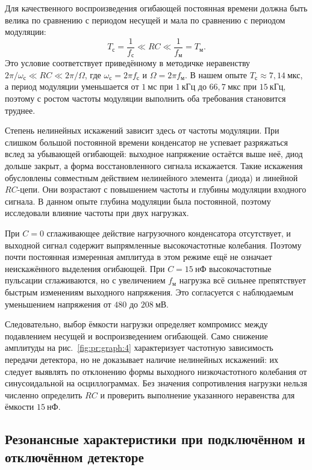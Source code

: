 Для качественного воспроизведения огибающей постоянная времени должна быть велика по сравнению с периодом несущей и мала по сравнению с периодом модуляции:
\[
T_{\text{с}}=\frac{1}{f_{\text{с}}}\ll RC\ll\frac{1}{f_{\text{м}}}=T_{\text{м}}.
\]
Это условие соответствует приведённому в методичке неравенству $2\pi/\omega_{\text{с}}\ll RC\ll 2\pi/\Omega$, где $\omega_{\text{с}}=2\pi f_{\text{с}}$ и $\Omega=2\pi f_{\text{м}}$. В нашем опыте $T_{\text{с}}\approx7{,}14~\text{мкс}$, а период модуляции уменьшается от $1~\text{мс}$ при $1~\text{кГц}$ до $66{,}7~\text{мкс}$ при $15~\text{кГц}$, поэтому с ростом частоты модуляции выполнить оба требования становится труднее.

Степень нелинейных искажений зависит здесь от частоты модуляции. При слишком большой постоянной времени конденсатор не успевает разряжаться вслед за убывающей огибающей: выходное напряжение остаётся выше неё, диод дольше закрыт, а форма восстановленного сигнала искажается. Такие искажения обусловлены совместным действием нелинейного элемента (диода) и линейной $RC$-цепи. Они возрастают с повышением частоты и глубины модуляции входного сигнала. В данном опыте глубина модуляции была постоянной, поэтому исследовали влияние частоты при двух нагрузках.

При $C=0$ сглаживающее действие нагрузочного конденсатора отсутствует, и выходной сигнал содержит выпрямленные высокочастотные колебания. Поэтому почти постоянная измеренная амплитуда в этом режиме ещё не означает неискажённого выделения огибающей. При $C=15~\text{нФ}$ высокочастотные пульсации сглаживаются, но с увеличением $f_{\text{м}}$ нагрузка всё сильнее препятствует быстрым изменениям выходного напряжения. Это согласуется с наблюдаемым уменьшением напряжения от $480$ до $208~\text{мВ}$.

Следовательно, выбор ёмкости нагрузки определяет компромисс между подавлением несущей и воспроизведением огибающей. Само снижение амплитуды на рис.~\ref{fig:pr:graph:4} характеризует частотную зависимость передачи детектора, но не доказывает наличие нелинейных искажений: их следует выявлять по отклонению формы выходного низкочастотного колебания от синусоидальной на осциллограммах. Без значения сопротивления нагрузки нельзя численно определить $RC$ и проверить выполнение указанного неравенства для ёмкости $15~\text{нФ}$.

\subsection{Резонансные характеристики при подключённом и отключённом детекторе}

